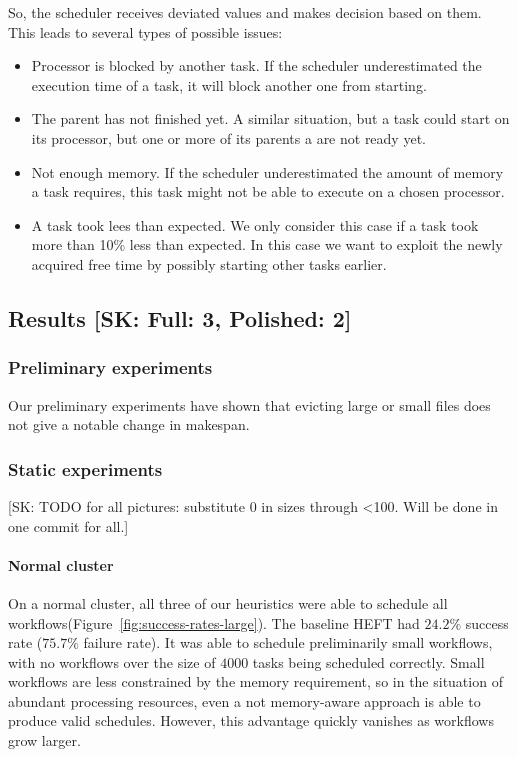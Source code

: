 \documentclass[conference]{IEEEtran}
\newcommand{\algo}[1]{\textsc{#1}}
\newcommand{\heft}{\algo{HEFT}\xspace}
\newcommand{\skug}[1]{{\color{blue}[SK: #1]}}
\begin{document}
    So, the scheduler receives deviated values and makes decision based on them.
    This leads to several types of possible issues:
    \begin{itemize}
        \item Processor is blocked by another task. If the scheduler underestimated the execution time of a task, it will block another
        one from starting.
        \item The parent has not finished yet. A similar situation, but a task could start on its processor, but one or more of its parents a
        are not ready yet.
        \item Not enough memory. If the scheduler underestimated the amount of memory a task requires, this task might not be able
        to execute on a chosen processor.
        \item A task took lees than expected. We only consider this case if a task took more than 10\% less than expected. In this
        case we want to exploit the newly acquired free time by possibly starting other tasks earlier.
    \end{itemize}



    \subsection{Results \skug{Full: 3, Polished: 2}}

    \subsubsection{Preliminary experiments}

    Our preliminary experiments have shown that evicting large or small files does not give a notable change in makespan.


    \subsubsection{Static experiments}

    \skug{TODO for all pictures: substitute 0 in sizes through <100. Will be done in one commit for all.}
    \paragraph{Normal cluster}

    On a normal cluster,  all three of our heuristics were able to schedule all workflows(Figure~\ref{fig:success-rates-large}).
    The baseline \heft had $24.2\%$ success rate ($75.7\%$ failure rate).
    It was able to schedule preliminarily small workflows, with no workflows over the size of $4000$ tasks being scheduled
    correctly.
    Small workflows are less constrained by the memory requirement, so in the situation of abundant processing resources, even
    a not memory-aware approach is able to produce valid schedules.
    However, this advantage quickly vanishes as workflows grow larger.
\end{document}
